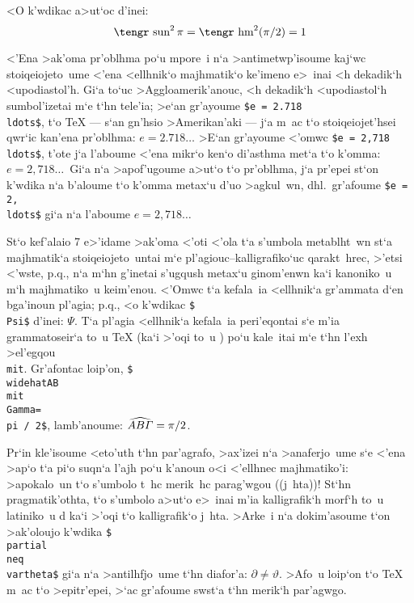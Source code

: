 \noindent
<O k'wdikac a>ut`oc d'inei:
\def\grsin{\mathop{\hbox{\tengr hm}}\nolimits}
\def\grcos{\mathop{\hbox{\tengr sun}}\nolimits}
$$ \grcos ^2 \pi = \grsin ^2 (\pi / 2) = 1 $$

<'Ena >ak'oma pr'oblhma po`u mpore~i n`a >antimetwp'isoume kaj`wc
stoiqeiojeto~ume <'ena <el\-lh\-ni\-k`o majhmatik`o ke'imeno e>~inai <h
dekadik`h <upodiastol'h.  Gi`a to`uc >Aggloamerik'anouc, <h dekadik`h
<upodiastol`h sumbol'izetai m`e t`hn tele'ia; >e`an gr'ayoume {\tt\$e =
2.718\\ldots\$}, t`o {\rm\TeX} --- s`an gn'hsio >Amerikan'aki --- j`a
m~ac t`o stoiqeiojet'hsei qwr`ic kan'ena pr'oblhma: $ e = 2.718\ldots$ 
>E`an gr'ayoume <'omwc {\tt\$e = 2,718\\ldots\$}, t'ote j`a l'aboume
<'ena mikr`o ken`o di'asthma met`a t`o k'omma: $e = 2,718\ldots$\space\
Gi`a n`a >apof'ugoume a>ut`o t`o pr'oblhma, j`a pr'epei st`on k'wdika
n`a b'aloume t`o k'omma metax`u d'uo >agkul~wn, dhl.\ gr'afoume {\tt\$e
= 2\lb,\rb718\\ldots\$} gi`a n`a l'aboume $e = 2{,}718\ldots$

St`o kef'alaio 7 e>'idame >ak'oma <'oti <'ola t`a s'umbola metablht~wn
st`a majhmatik`a stoiqeiojeto~untai m`e pl'agiouc--kalligrafiko`uc
qarakt~hrec, >'etsi <'wste, p.q., n`a m`hn g'inetai s'ugqush metax`u
ginom'enwn ka`i kanoniko~u m`h majhmatiko~u keim'enou.  <'Omwc t`a
kefala~ia <ellhnik`a gr'ammata d`en bga'inoun pl'agia; p.q., <o k'wdikac
{\tt\$\\Psi\$} d'inei: $\Psi$\null.  T`a pl'agia <ellhnik`a kefala~ia
peri'eqontai s`e m'ia grammatoseir`a to~u {\rm\TeX} (ka`i >'oqi to~u
\greektex) po`u kale~itai m`e t`hn l'exh >el'egqou {\tt\\mit}. 
Gr'afontac loip'on, {\tt\$\\widehat\lb AB\lb\\mit \\Gamma\rb\rb = \\pi /
2\$}, lamb'anoume: $\widehat{AB{\mit\Gamma}} = \pi / 2$.

Pr`in kle'isoume <eto'uth t`hn par'agrafo, >ax'izei n`a >anaferjo~ume
s`e <'ena >ap`o t`a pi`o suqn`a l'ajh po`u k'anoun o<i <'ellhnec
majhmatiko'i: >apokalo~un t`o s'umbolo t~hc merik~hc parag'wgou
((j~hta))!  St`hn pragmatik'othta, t`o s'umbolo a>ut`o e>~inai m'ia
kalligrafik`h morf`h to~u la\-ti\-ni\-ko~u {\rm d} ka`i >'oqi t`o
kalligrafik`o j~hta.  >Arke~i n`a dokim'asoume t`on >ak'oloujo k'wdika
{\tt\$\\partial \\neq \\vartheta\$} gi`a n`a >antilhfjo~ume t`hn
diafor'a: $\partial \neq \vartheta$\null.  >Afo~u loip`on t`o {\rm\TeX}
m~ac t`o >epitr'epei, >`ac gr'afoume swst`a t`hn merik`h par'agwgo.


